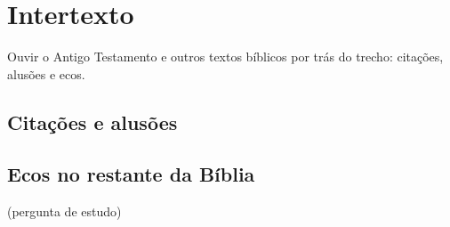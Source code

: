 \chapter{Intertexto}\label{cap:intertexto}

\begin{objetivo}
Ouvir o Antigo Testamento e outros textos bíblicos por trás do trecho: citações, alusões e ecos.
\end{objetivo}

\section{Citações e alusões}

\section{Ecos no restante da Bíblia}

\begin{pergunta}
(pergunta de estudo)
\end{pergunta}
